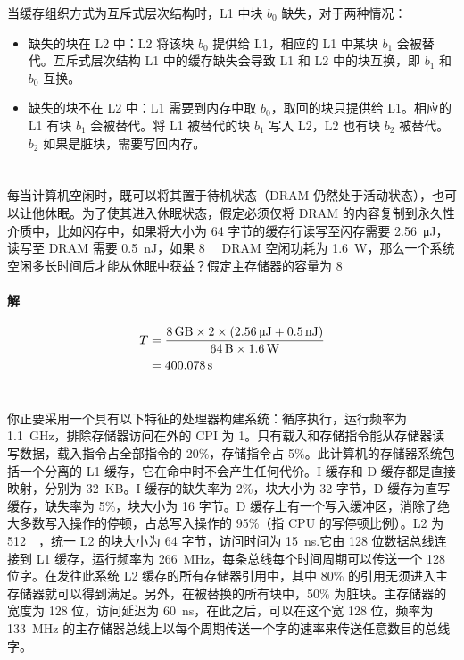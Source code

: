 \documentclass{article}
\begin{document}
当缓存组织方式为互斥式层次结构时，L1 中块 $b_0$ 缺失，对于两种情况：
\begin{itemize}
    \item 缺失的块在 L2 中：L2 将该块 $b_0$ 提供给 L1，相应的 L1 中某块 $b_1$ 会被替代。互斥式层次结构 L1 中的缓存缺失会导致 L1 和 L2 中的块互换，即 $b_1$ 和 $b_0$ 互换。
    \item 缺失的块不在 L2 中：L1 需要到内存中取 $b_0$，取回的块只提供给 L1。相应的 L1 有块 $b_1$ 会被替代。将 L1 被替代的块 $b_1$ 写入 L2，L2 也有块 $b_2$ 被替代。$b_2$ 如果是脏块，需要写回内存。
\end{itemize}
\section{}
每当计算机空闲时，既可以将其置于待机状态（DRAM 仍然处于活动状态），也可以让他休眠。为了使其进入休眠状态，假定必须仅将 DRAM 的内容复制到永久性介质中，比如闪存中，如果将大小为 64 字节的缓存行读写至闪存需要 \SI{2.56}{\micro\joule}，读写至 DRAM 需要 \SI{0.5}{\nano\joule}，如果 \SI{8}{\giga\byte} DRAM 空闲功耗为 \SI{1.6}{\watt}，那么一个系统空闲多长时间后才能从休眠中获益？假定主存储器的容量为 \SI{8}{\giga\byte}


\paragraph{解}
\begin{align*}
    T &= \frac{\SI{8}{\giga\byte} \times 2 \times (\SI{2.56}{\micro\joule} + \SI{0.5}{\nano\joule})}{\SI{64}{\byte} \times \SI{1.6}{\watt}} \\
    &= \SI{400.078}{\second}
\end{align*}


\section{}
你正要采用一个具有以下特征的处理器构建系统：循序执行，运行频率为 \SI{1.1}{\giga\hertz}，排除存储器访问在外的 CPI 为 1。只有载入和存储指令能从存储器读写数据，载入指令占全部指令的 20\%，存储指令占 5\%。此计算机的存储器系统包括一个分离的 L1 缓存，它在命中时不会产生任何代价。I 缓存和 D 缓存都是直接映射，分别为 \SI{32}{KB}。I 缓存的缺失率为 2\%，块大小为 32 字节，D 缓存为直写缓存，缺失率为 5\%，块大小为 16 字节。D 缓存上有一个写入缓冲区，消除了绝大多数写入操作的停顿，占总写入操作的 95\%（指 CPU 的写停顿比例）。L2 为 \SI{512}{\kilo\byte}，统一 L2 的块大小为 64 字节，访问时间为 \SI{15}{\nano\second}.它由 128 位数据总线连接到 L1 缓存，运行频率为 \SI{266}{\mega\hertz}，每条总线每个时间周期可以传送一个 128 位字。在发往此系统 L2 缓存的所有存储器引用中，其中 80\% 的引用无须进入主存储器就可以得到满足。另外，在被替换的所有块中，50\% 为脏块。主存储器的宽度为 128 位，访问延迟为 \SI{60}{\nano\second}，在此之后，可以在这个宽 128 位，频率为 \SI{133}{\mega\hertz} 的主存储器总线上以每个周期传送一个字的速率来传送任意数目的总线字。
\end{document}

